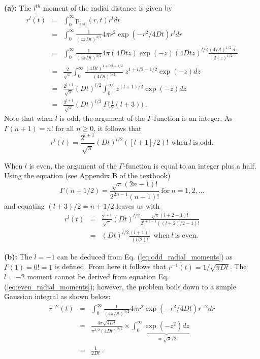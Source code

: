 \textbf{(a):} The $l^{th}$ moment of the radial distance is given by
\begin{eqnarray}
\overline{r^l(t)} &=& \int_{0}^{\infty} \text{p}_\text{rad}(r, t) r^l dr \nonumber \\
&=&  \int_{0}^{\infty} \frac{1}{(4 \pi D t)^{3/2}} 4 \pi r^2 \exp(-r^2/4Dt) r^l dr \nonumber \\
&=&  \int_{0}^{\infty} \frac{1}{(4 \pi D t)^{3/2}} 4 \pi (4 D t z) \exp(-z) (4 D t z)^{l/2} \frac{(4 D t)^{1/2} ~dz}{2 (z)^{1/2}} \nonumber \\
&=&  \frac{2}{\sqrt{\pi}} \int_{0}^{\infty} \frac{(4 D t)^{1+l/2+1/2}}{(4 D t)^{3/2}}~ z^{1+l/2-1/2} \exp(-z) dz \nonumber \\
&=& \frac{2^{l+1}}{\sqrt{\pi}} (D t)^{l/2} \int_{0}^{\infty}~ z^{(l+1)/2} \exp(-z) dz \nonumber \\
&=& \boxed{\frac{2^{l+1}}{\sqrt{\pi}} (D t)^{l/2}~\Gamma\bigg(\frac{1}{2}(l+3)\bigg)}~.
\end{eqnarray}
Note that when $l$ is odd, the argument of the $\Gamma$-function is an integer. As $\Gamma(n+1) = n!$ for all $n \geq 0 $, it follows that 
\begin{equation}
\boxed{ \overline{r^l(t)} = \frac{2^{l+1}}{\sqrt{\pi}} (D t)^{l/2} ([l+1]/2)!~~\text{when}~l~\text{is odd.}} \label{eq:odd_radial_moments}
\end{equation}

When $l$ is even, the argument of the $\Gamma$-function is equal to an integer plus a half. Using the equation (see Appendix B of the textbook)
\begin{equation}
\Gamma(n+1/2) = \frac{\sqrt{\pi} (2n-1)!}{2^{2n-1}(n-1)!}~\text{for}~n = 1, 2, \ldots \nonumber
\end{equation}
and equating $(l+3)/2 = n + 1/2$ leaves us with
\begin{eqnarray}
\overline{r^l(t)} &=& \frac{2^{l+1}}{\sqrt{\pi}} (D t)^{l/2} \frac{\sqrt{\pi} (l+2-1)!}{2^{l+2-1}((l+2)/2-1)!} \nonumber \\
&=& \boxed{(D t)^{l/2} \frac{(l+1)!}{(l/2)!} ~~\text{when}~l~\text{is even.}} \label{eq:even_radial_moments}
\end{eqnarray}

\textbf{(b):} The $l=-1$ can be deduced from Eq. (\ref{eq:odd_radial_moments}) as $\Gamma(1) = 0! = 1$ is defined. From here it follows that $\overline{r^{-1}(t)} = 1/\sqrt{\pi Dt}$. The $l=-2$ moment cannot be derived from equation Eq. (\ref{eq:even_radial_moments}); however, the problem boils down to a simple Gaussian integral as shown below:
\begin{eqnarray}
\overline{r^{-2}(t)} &=& \int_{0}^{\infty} \frac{1}{(4 \pi D t)^{3/2}} 4 \pi r^2 \exp(-r^2/4Dt) r^{-2} dr \nonumber \\
&=& \frac{4 \pi \sqrt{4Dt}}{\pi^{3/2} (4Dt)^{3/2}} \times \int_{0}^{\infty} \underbrace{\exp(-z^2) dz}_{=\sqrt{\pi}/2} \nonumber \\
&=& \boxed{\frac{1}{2Dt}}~.
\end{eqnarray}
